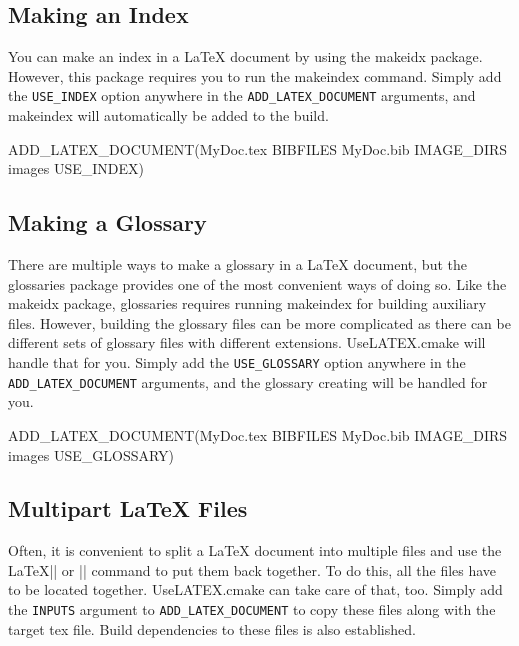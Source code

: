 \documentclass{article}
\newcommand*{\textfile}[1]{\textsf{#1}}
\newcommand*{\textprog}[1]{\textfile{#1}}
\newcommand*{\textlatexpackage}[1]{\textsf{#1}}
\newcommand*{\textcmake}[1]{\texttt{#1}}
\newcommand*{\UseLATEX}{\textfile{UseLATEX.cmake}\xspace}
\newcommand*{\latex}{\LaTeX\xspace}
\newcommand*{\ald}{\textcmake{ADD\_LATEX\_DOCUMENT}\xspace}
\begin{document}
  \subsection{Making an Index}
  \label{sec:MakingAnIndex}

  You can make an index in a \latex document by using the
  \textlatexpackage{makeidx} package. However, this package requires you to
  run the \textprog{makeindex} command. Simply add the
  \textcmake{USE\_INDEX} option anywhere in the \ald arguments, and
  \textprog{makeindex} will automatically be added to the build.

  \begin{CodeListing}
ADD_LATEX_DOCUMENT(MyDoc.tex BIBFILES MyDoc.bib
                   IMAGE_DIRS images
		   USE_INDEX)
  \end{CodeListing}

  \subsection{Making a Glossary}
  \label{sec:MakingAGlossary}

  There are multiple ways to make a glossary in a \latex document, but the
  \textlatexpackage{glossaries} package provides one of the most convenient
  ways of doing so.  Like the \textlatexpackage{makeidx} package,
  \textlatexpackage{glossaries} requires running \textprog{makeindex} for
  building auxiliary files.  However, building the glossary files can be
  more complicated as there can be different sets of glossary files with
  different extensions.  \UseLATEX will handle that for you.  Simply add
  the \textcmake{USE\_GLOSSARY} option anywhere in the \ald arguments, and
  the glossary creating will be handled for you.

  \begin{CodeListing}
ADD_LATEX_DOCUMENT(MyDoc.tex BIBFILES MyDoc.bib
                   IMAGE_DIRS images
		   USE_GLOSSARY)
  \end{CodeListing}

  \subsection{Multipart \latex Files}
  \label{sec:MultipartLatexFiles}

  Often, it is convenient to split a \latex document into multiple files
  and use the \latex \textlatex|| or \textlatex|| command to
  put them back together. To do this, all the files have to be located
  together. \UseLATEX can take care of that, too. Simply add the
  \textcmake{INPUTS} argument to \ald to copy these files along with the
  target tex file. Build dependencies to these files is also established.
\end{document}
